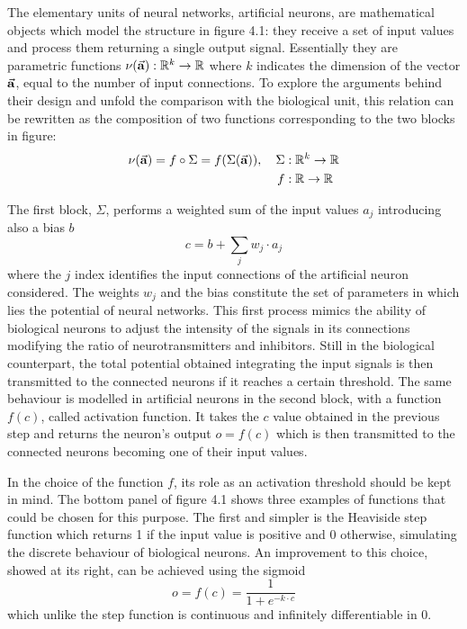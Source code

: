 \documentclass[a4paper,10pt]{report}
\begin{document}
The elementary units of neural networks, artificial neurons, are mathematical objects
which model the structure in figure 4.1: they receive a set of input values
and process them returning a single output signal.
Essentially they are parametric functions $\nu(\va a): \mathbb R ^k \rightarrow \mathbb R$ 
where $k$ indicates the dimension of the vector $\va a$, equal to the number of input connections.
To explore the arguments behind their design and unfold the
comparison with the biological unit, this relation can be rewritten 
as the composition of two functions corresponding to the two blocks in figure:
\begin{align}
    \nu (\va a) = f \circ \Sigma = f(\Sigma (\va a)), \hspace{10pt}
    \Sigma &: \mathbb R^k \rightarrow \mathbb R \\
    f &: \mathbb R \rightarrow \mathbb R \nonumber
\end{align}

The first block, $\Sigma$, performs a weighted sum of the input values $a_{j}$ introducing also a bias $b$
\begin{equation}
   c = b + \sum_j w_{j} \cdot a_{j} 
\end{equation}
where the $j$ index identifies the input connections of the artificial neuron considered.
The weights $w_{j}$ and the bias constitute the set of parameters in which
lies the potential of neural networks.
This first process mimics the ability of biological neurons to adjust the intensity of the signals in its connections
modifying the ratio of neurotransmitters and inhibitors.
Still in the biological counterpart, the total potential obtained integrating the input signals is then transmitted to the 
connected neurons if it reaches a certain threshold.
The same behaviour is modelled in artificial neurons in the second block, 
with a function $f(c)$, called activation function. It takes the $c$ value obtained in the
previous step and returns the neuron's output $o = f(c)$ which is then transmitted to the connected neurons 
becoming one of their input values.

In the choice of the function $f$, its role as an activation threshold should be kept in mind.
The bottom panel of figure 4.1 shows three examples of functions that could be chosen for this purpose.
The first and simpler is the Heaviside step function which
returns 1 if the input value is positive and 0 otherwise, simulating the discrete behaviour of 
biological neurons.
An improvement to this choice, showed at its right, can be achieved using the sigmoid
\begin{equation}
    o = f(c) = \frac{1}{1+e^{-k\cdot c}}
\end{equation}
which unlike the step function is continuous and infinitely differentiable in 0.
\end{document}
